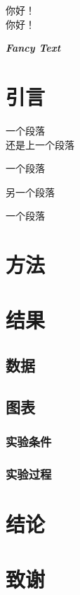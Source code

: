 \documentclass[12pt]{article} %
\newcommand{\myfont}{\textit{\textbf{\textsf{Fancy Text}}}}
\begin{document}
	{ 你好！}\\ %
	{ 你好！}
	
	\myfont
	
	
	\tableofcontents %
	
	\section{引言}
	一个段落\\还是上一个段落 %
	
	一个段落\par 另一个段落 %
	
	一个段落
	\section{方法}
	\section{结果}
	\subsection{数据}
	\subsection{图表}
	\subsubsection{实验条件}
	\subsubsection{实验过程}
	\section{结论}
	\section{致谢}
	
\end{document}
